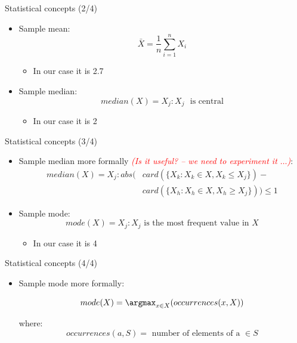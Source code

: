 \documentclass{beamer}
\begin{document}
\begin{frame}
{\centerline{Statistical concepts (2/4)}}

\begin{itemize}
\item Sample mean:
$$ \bar{X} = \frac{1}{n}\sum_{i=1}^{n}X_i$$ 
\begin{itemize}
\item In our case it is 2.7
\end{itemize}
\vspace*{0.5cm}
\item Sample median:
$$  median(X) = X_j : X_j \text{~ is central} $$ 
\begin{itemize}
\item In our case it is 2
\end{itemize}


\end{itemize}

\end{frame}

\begin{frame}
{\centerline{Statistical concepts (3/4)}}

\begin{itemize}
\item Sample median more formally \textcolor{red}{\em (Is it useful? -- we need to experiment it $\ldots{}$)}:\\

\begin{equation*}
\begin{split}
median(X) = X_j   :  abs( & card(\{X_k : X_k \in X, X_k \le X_j\}) -  \\
                                       &  card(\{X_h : X_h \in X, X_h \ge X_j\})) \le 1
\end{split}
\end{equation*}

\item Sample mode:
$$  mode(X) = X_j : X_j \text{ is the most frequent value in } X$$ 
\begin{itemize}
\item In our case it is 4
\end{itemize}


\end{itemize}


\end{frame}

\begin{frame}
{\centerline{Statistical concepts (4/4)}}

\begin{itemize}

\item Sample mode more formally:

$$  mode(X) = \argmax_{x \in X} (occurrences(x,X))$$ 

where:
$$ occurrences(a,S) = \text{ number of elements of a } \in S $$



\end{itemize}


\end{frame}
\end{document}
